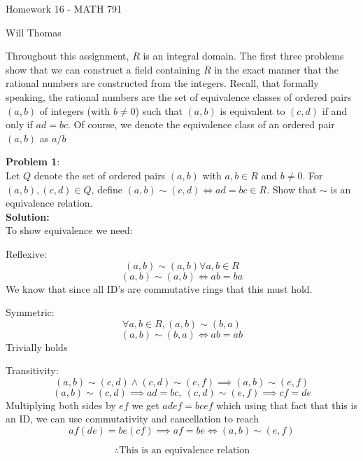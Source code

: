 \documentclass[11pt]{article}
\newcommand{\prob}[3]{\begin{flushleft}
        \textbf{Problem #1}: \\
        #2 
		\textbf{Solution:} 
		#3

\end{flushleft}}
\newcommand{\makeHWtitle}[1]{
    \begin{center}
    \Large{Homework #1 - MATH 791} 
        \vspace{5pt}
        
        \normalsize{Will Thomas}
        \vspace{5pt}
    \end{center}
}
\begin{document}
\makeHWtitle{16}
Throughout this assignment, $R$ is an integral domain. The first three problems show that we can construct a field
containing $R$ in the exact manner that the rational numbers are constructed from the integers.
Recall, that formally speaking, the rational numbers are the set of equivalence classes of ordered pairs $(a,b)$ of integers
(with $b \neq 0$) such that $(a,b)$ is equivalent to $(c,d)$ if and only if $ad = bc$. Of course,
we denote the equivalence class of an ordered pair $(a,b)$ as $a/b$

\prob{1}{
  Let $Q$ denote the set of ordered pairs $(a,b)$ with $a,b \in R$ and $b \neq 0$. For $(a,b), (c,d) \in Q$, define $(a,b) \sim (c,d) \iff ad = bc \in R$.
  Show that $\sim$ is an equivalence relation. \\
}{ \\
  To show equivalence we need:

  Reflexive:
  $$(a,b) \sim (a,b) \forall a, b \in R$$
  $$(a,b) \sim (a,b) \iff ab = ba$$
  We know that since all ID's are commutative rings that this must hold.

  Symmetric:
  $$\forall a, b \in R, (a,b) \sim (b,a)$$
  $$(a,b) \sim (b,a) \iff ab = ab$$
  Trivially holds

  Transitivity:
  $$(a,b) \sim (c,d) \land (c,d) \sim (e,f) \implies (a,b) \sim (e,f)$$
  $$(a,b) \sim (c,d) \implies ad = bc,\ (c,d) \sim (e,f) \implies cf = de$$
  Multiplying both sides by $ef$ we get $adef = bcef$ which using that fact that this is an ID, we can use commutativity and
  cancellation to reach
  $$af(de) = be(cf) \implies af = be \iff (a,b) \sim (e,f)$$

  $$\therefore \text{This is an equivalence relation}$$
}
\end{document}
